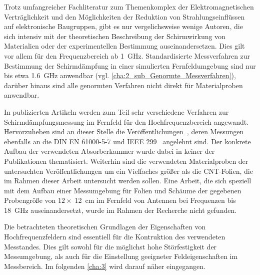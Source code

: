 
Trotz umfangreicher Fachliteratur zum Themenkomplex der Elektromagnetischen Verträglichkeit und den Möglichkeiten der Reduktion von Strahlungseinflüssen auf elektronische Baugruppen, gibt es nur vergelichsweise wenige Autoren, die sich intensiv mit der theoretischen Beschreibung der Schirmwirkung von Materialien oder der experimentellen Bestimmung auseinandersetzen. Dies gilt vor allem für den Frequenzbereich ab \SI{1}{\giga\hertz}. Standardisierte Messverfahren zur Bestimmung der Schirmdämpfung in einer simulierten Fernfeldumgebung sind nur bis etwa \SI{1,6}{\giga\hertz} anwendbar (vgl. \Abschnitt\ref{cha:2_sub_Genormte_Messverfahren}), darüber hinaus sind alle genormten Verfahren nicht direkt für Materialproben anwendbar. 
\par
\vspace{\linespace}
In publizierten Artikeln werden zum Teil sehr verschiedene Verfahren zur Schirmdämpfungsmessung im Fernfeld für den Hochfrequenzbereich angewandt. Hervorzuheben sind an dieser Stelle die Veröffentlichungen~\cite{Measurement_Shielding_Textile_Materials_Free_Space_Transmission, Predicted_and_Measured_EMI_Effectiveness_Metallic_Mesh_on_Window}, deren Messungen ebenfalls an die DIN EN 61000-5-7 und IEEE 299~\cite{DIN_EN_61000-5-7, IEEE_299} angelehnt sind. Der konkrete Aufbau der verwendeten Absorberkammer wurde dabei in keiner der Publikationen thematisiert. Weiterhin sind die verwendeten Materialproben der untersuchten Veröffentlichungen um ein Vielfaches größer als die CNT-Folien, die im Rahmen dieser Arbeit untersucht werden sollen. Eine Arbeit, die sich speziell mit dem Aufbau einer Messumgebung für Folien und Schäume der gegebenen Probengröße von $12 \times \;$\SI{12}{\centi\meter} im Fernfeld von Antennen bei Frequenzen bis \SI{18}{\giga\hertz} auseinandersetzt, wurde im Rahmen der Recherche nicht gefunden.
\par
\vspace{\linespace}
Die betrachteten theoretischen Grundlagen der Eigenschaften von Hochfrequenzfeldern sind essentiell für die Kontruktion des verwendeten Messtandes. Dies gilt sowohl für die möglichst hohe Störfestigkeit der Messumgebung, als auch für die Einstellung geeigneter Feldeigenschaften im Messbereich. Im folgenden \Kapitel\ref{cha:3} wird darauf näher eingegangen.






